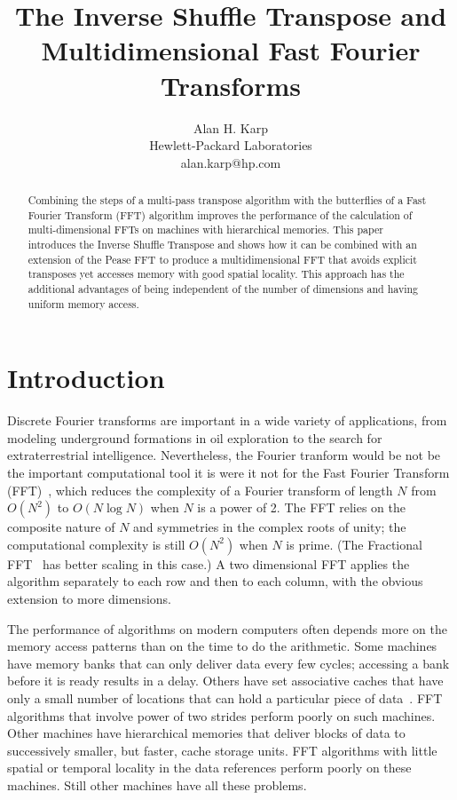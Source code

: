 \documentclass{article}
\title{The Inverse Shuffle Transpose and \\
       Multidimensional Fast Fourier Transforms}
\author{Alan H. Karp \\
        Hewlett-Packard Laboratories \\
        alan.karp@hp.com}
\begin{document}
\maketitle

\begin{abstract}

Combining the steps of a multi-pass transpose algorithm with the
butterflies of a Fast Fourier Transform (FFT) algorithm improves the
performance of the calculation of multi-dimensional FFTs on machines
with hierarchical memories.  This paper introduces the Inverse Shuffle
Transpose and shows how it can be combined with an extension of the
Pease FFT to produce a multidimensional FFT that avoids explicit
transposes yet accesses memory with good spatial locality.  This
approach has the additional advantages of being independent of the
number of dimensions and having uniform memory access.


\end{abstract}

\section{Introduction}

Discrete Fourier transforms are important in a wide variety of
applications, from modeling underground formations in oil exploration
to the search for extraterrestrial intelligence.  Nevertheless, the
Fourier tranform would be not be the important computational tool it
is were it not for the Fast Fourier Transform (FFT)~\cite{cooley},
which reduces the complexity of a Fourier transform of length $N$ from
$O(N^2)$ to $O(N \log N)$ when $N$ is a power of 2.  The FFT relies
on the composite nature of $N$ and symmetries in the complex roots of
unity; the computational complexity is still $O(N^2)$ when $N$ is
prime.  (The Fractional FFT~\cite{fractional} has better scaling in
this case.)  A two dimensional FFT applies the algorithm separately to
each row and then to each column, with the obvious extension to more
dimensions.

The performance of algorithms on modern computers often depends more
on the memory access patterns than on the time to do the arithmetic.
Some machines have memory banks that can only deliver data every few
cycles; accessing a bank before it is ready results in a delay.
Others have set associative caches that have only a small number of
locations that can hold a particular piece of data~\cite{hennessey}.
FFT algorithms that involve power of two strides perform poorly on
such machines.  Other machines have hierarchical memories that deliver
blocks of data to successively smaller, but faster, cache storage
units.  FFT algorithms with little spatial or temporal locality in the
data references perform poorly on these machines.  Still other
machines have all these problems.
\end{document}
